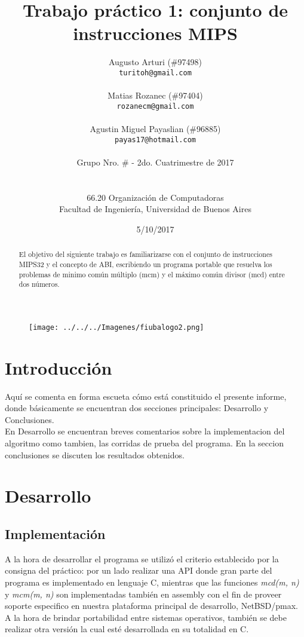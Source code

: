 \documentclass[a4paper,10pt]{article}
\title{\textbf{Trabajo práctico 1: conjunto de instrucciones MIPS}}
\author{Augusto Arturi (\#97498)\\
\texttt{turitoh@gmail.com}\\
\\
Matias Rozanec (\#97404)\\            \texttt{rozanecm@gmail.com}\\
\\
Agustin Miguel Payaslian (\#96885)\\            \texttt{payas17@hotmail.com}\\
\\
\normalsize{Grupo Nro. \# - 2do. Cuatrimestre de 2017}\\
\\
\\
\normalsize{66.20 Organización de Computadoras}\\
\normalsize{Facultad de Ingeniería, Universidad de Buenos Aires}\\
}
\date{5/10/2017}
\begin{document}
\maketitle


\begin{figure}[!htp]
\centering
\texttt{[image: ../../../Imagenes/fiubalogo2.png]} 

\end{figure}
\thispagestyle{empty}
\newpage

\begin{abstract}
El objetivo del siguiente trabajo es familiarizarse con el conjunto de instrucciones MIPS32 y el concepto de ABI, escribiendo un programa portable que resuelva los problemas de minimo común múltiplo (mcm) y el máximo común divisor (mcd) entre dos números.
\end{abstract}


\section{Introducción}
Aquí se comenta en forma escueta cómo está constituido el presente informe, donde  básicamente  se  encuentran  dos  secciones  principales: Desarrollo y Conclusiones.\\
En Desarrollo se encuentran breves comentarios sobre la implementacion del algoritmo como tambien, las corridas de prueba del programa. En la seccion conclusiones se discuten los resultados obtenidos.

\section{Desarrollo}

\subsection{Implementación}
A la hora de desarrollar el programa se utilizó el criterio establecido por la consigna del práctico: por un lado realizar una API donde gran parte del programa es implementado en lenguaje C, mientras que las funciones \textit{mcd(m, n)} y \textit{mcm(m, n)} son implementadas también en assembly con el fin de proveer soporte especifico en nuestra plataforma principal de desarrollo, NetBSD/pmax. A la hora de brindar portabilidad entre sistemas operativos, también se debe realizar otra versión la cual esté desarrollada en su totalidad en C.
\end{document}
